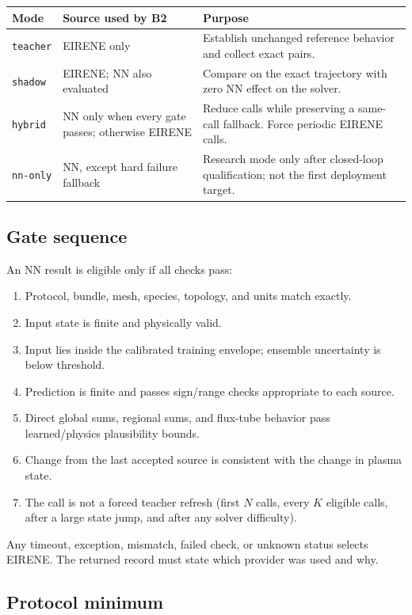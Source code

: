 \documentclass[11pt]{article}
\begin{document}
\begin{tabularx}{\linewidth}{@{}lYY@{}}
\toprule
Mode & Source used by B2 & Purpose \\
\midrule
\texttt{teacher} & EIRENE only & Establish unchanged reference behavior and collect exact pairs. \\
\texttt{shadow} & EIRENE; NN also evaluated & Compare on the exact trajectory with zero NN effect on the solver. \\
\texttt{hybrid} & NN only when every gate passes; otherwise EIRENE & Reduce calls while preserving a same-call fallback. Force periodic EIRENE calls. \\
\texttt{nn-only} & NN, except hard failure fallback & Research mode only after closed-loop qualification; not the first deployment target. \\
\bottomrule
\end{tabularx}

\subsection{Gate sequence}

An NN result is eligible only if all checks pass:

\begin{enumerate}
\item Protocol, bundle, mesh, species, topology, and units match exactly.
\item Input state is finite and physically valid.
\item Input lies inside the calibrated training envelope; ensemble uncertainty is below threshold.
\item Prediction is finite and passes sign/range checks appropriate to each source.
\item Direct global sums, regional sums, and flux-tube behavior pass learned/physics plausibility bounds.
\item Change from the last accepted source is consistent with the change in plasma state.
\item The call is not a forced teacher refresh (first $N$ calls, every $K$ eligible calls, after a large state jump, and after any solver difficulty).
\end{enumerate}

Any timeout, exception, mismatch, failed check, or unknown status selects EIRENE. The returned record must state which provider was used and why.

\subsection{Protocol minimum}
\end{document}
